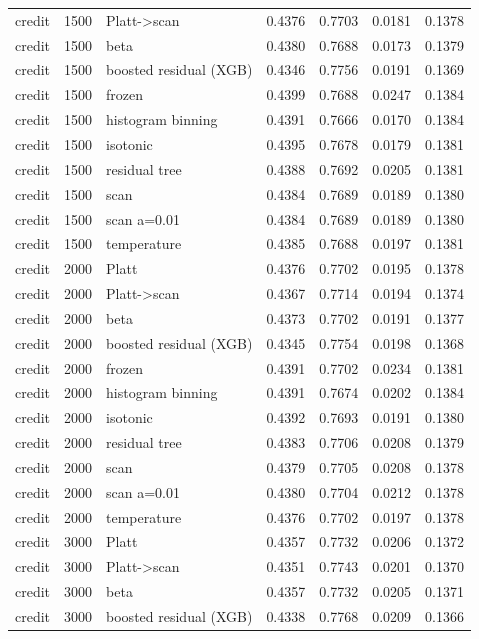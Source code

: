 \begin{tabular}{lllrrrr}
credit & 1500 & Platt->scan & 0.4376 & 0.7703 & 0.0181 & 0.1378 \\
credit & 1500 & beta & 0.4380 & 0.7688 & 0.0173 & 0.1379 \\
credit & 1500 & boosted residual (XGB) & 0.4346 & 0.7756 & 0.0191 & 0.1369 \\
credit & 1500 & frozen & 0.4399 & 0.7688 & 0.0247 & 0.1384 \\
credit & 1500 & histogram binning & 0.4391 & 0.7666 & 0.0170 & 0.1384 \\
credit & 1500 & isotonic & 0.4395 & 0.7678 & 0.0179 & 0.1381 \\
credit & 1500 & residual tree & 0.4388 & 0.7692 & 0.0205 & 0.1381 \\
credit & 1500 & scan & 0.4384 & 0.7689 & 0.0189 & 0.1380 \\
credit & 1500 & scan a=0.01 & 0.4384 & 0.7689 & 0.0189 & 0.1380 \\
credit & 1500 & temperature & 0.4385 & 0.7688 & 0.0197 & 0.1381 \\
credit & 2000 & Platt & 0.4376 & 0.7702 & 0.0195 & 0.1378 \\
credit & 2000 & Platt->scan & 0.4367 & 0.7714 & 0.0194 & 0.1374 \\
credit & 2000 & beta & 0.4373 & 0.7702 & 0.0191 & 0.1377 \\
credit & 2000 & boosted residual (XGB) & 0.4345 & 0.7754 & 0.0198 & 0.1368 \\
credit & 2000 & frozen & 0.4391 & 0.7702 & 0.0234 & 0.1381 \\
credit & 2000 & histogram binning & 0.4391 & 0.7674 & 0.0202 & 0.1384 \\
credit & 2000 & isotonic & 0.4392 & 0.7693 & 0.0191 & 0.1380 \\
credit & 2000 & residual tree & 0.4383 & 0.7706 & 0.0208 & 0.1379 \\
credit & 2000 & scan & 0.4379 & 0.7705 & 0.0208 & 0.1378 \\
credit & 2000 & scan a=0.01 & 0.4380 & 0.7704 & 0.0212 & 0.1378 \\
credit & 2000 & temperature & 0.4376 & 0.7702 & 0.0197 & 0.1378 \\
credit & 3000 & Platt & 0.4357 & 0.7732 & 0.0206 & 0.1372 \\
credit & 3000 & Platt->scan & 0.4351 & 0.7743 & 0.0201 & 0.1370 \\
credit & 3000 & beta & 0.4357 & 0.7732 & 0.0205 & 0.1371 \\
credit & 3000 & boosted residual (XGB) & 0.4338 & 0.7768 & 0.0209 & 0.1366 \\

\end{tabular}
